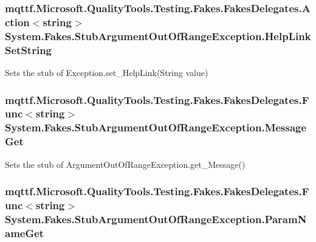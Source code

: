 \hypertarget{class_system_1_1_fakes_1_1_stub_argument_out_of_range_exception_af561fdae04c02d3f28136a839befafa6}{
\subsubsection[{Help\-Link\-Set\-String}]{\setlength{\rightskip}{0pt plus 5cm}mqttf.\-Microsoft.\-Quality\-Tools.\-Testing.\-Fakes.\-Fakes\-Delegates.\-Action$<$string$>$ System.\-Fakes.\-Stub\-Argument\-Out\-Of\-Range\-Exception.\-Help\-Link\-Set\-String}}\label{class_system_1_1_fakes_1_1_stub_argument_out_of_range_exception_af561fdae04c02d3f28136a839befafa6}


Sets the stub of Exception.\-set\-\_\-\-Help\-Link(\-String value)

\hypertarget{class_system_1_1_fakes_1_1_stub_argument_out_of_range_exception_a1d001b2fe42a0313bc7479270cada11c}{
\subsubsection[{Message\-Get}]{\setlength{\rightskip}{0pt plus 5cm}mqttf.\-Microsoft.\-Quality\-Tools.\-Testing.\-Fakes.\-Fakes\-Delegates.\-Func$<$string$>$ System.\-Fakes.\-Stub\-Argument\-Out\-Of\-Range\-Exception.\-Message\-Get}}\label{class_system_1_1_fakes_1_1_stub_argument_out_of_range_exception_a1d001b2fe42a0313bc7479270cada11c}


Sets the stub of Argument\-Out\-Of\-Range\-Exception.\-get\-\_\-\-Message()

\hypertarget{class_system_1_1_fakes_1_1_stub_argument_out_of_range_exception_a78fda915c93ae728a10691eb80357337}{
\subsubsection[{Param\-Name\-Get}]{\setlength{\rightskip}{0pt plus 5cm}mqttf.\-Microsoft.\-Quality\-Tools.\-Testing.\-Fakes.\-Fakes\-Delegates.\-Func$<$string$>$ System.\-Fakes.\-Stub\-Argument\-Out\-Of\-Range\-Exception.\-Param\-Name\-Get}}\label{class_system_1_1_fakes_1_1_stub_argument_out_of_range_exception_a78fda915c93ae728a10691eb80357337}


